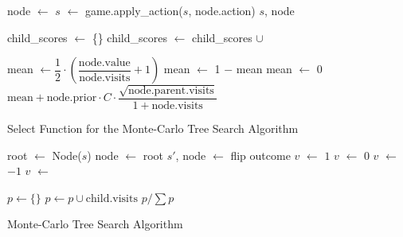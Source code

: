 \begin{algorithm}[htb]
    \begin{algorithmic}[1]
                \State node $\gets$ 
                \State $s$ $\gets$ game.apply\_action($s$, node.action)
            \EndWhile
            \State \Return $s$, node
        \EndFunction
        
            \State child\_scores $\gets$ \{\}
                \State child\_scores $\gets$ child\_scores $\cup$ 
            \EndFor
            \Return {}
        \EndFunction
        
                \State mean $\gets \dfrac{1}{2}\cdot\left(\dfrac{ \text{node.value} }{ \text{node.visits} } + 1\right)$
                    \State mean $\gets$ 1 $-$ mean
                \EndIf
            \Else
                \State mean $\gets$ 0
            \EndIf
            \State \Return $\text{mean} + \text{node.prior} \cdot C \cdot \dfrac{\sqrt{\text{node.parent.visits}}}{1 + \text{node.visits}}$  
        \EndFunction
    \end{algorithmic}
    \caption{Select Function for the Monte-Carlo Tree Search Algorithm}
    \label{alg:select}
\end{algorithm}
\begin{algorithm}[htb]
    \begin{algorithmic}[1]
            \State root $\gets$ Node($s$)
            \Repeat
                \State node $\gets$ root
                \State $s'$, node $\gets$ 
                      \State flip outcome
                    \EndIf
                      \State $v$ $\gets$ $1$
                      \State $v$ $\gets$ $0$
                      \State $v$ $\gets$ $-1$
                    \EndIf
                \Else
                    \State $v$ $\gets$ 
                \EndIf
        
                \State {}

            \State $p \gets \{\}$
            \State $p \gets p \cup \text{child.visits}$
            \EndFor
            \State \Return $p / \sum p$
        \EndFunction
    \end{algorithmic}
    \caption{Monte-Carlo Tree Search Algorithm}
    \label{alg:mcts}
\end{algorithm}

